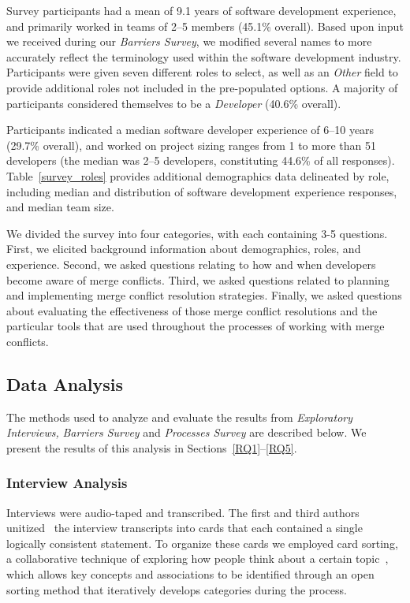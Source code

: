 Survey participants had a mean of 9.1 years of software development experience, and primarily worked in teams of 2--5 members (45.1\% overall).
Based upon input we received during our \textit{Barriers Survey}, we modified several names to more accurately reflect the terminology used within the software development industry.
Participants were given seven different roles to select, as well as an \textit{Other} field to provide additional roles not included in the pre-populated options.
A majority of participants considered themselves to be a \textit{Developer} (40.6\% overall).

Participants indicated a median software developer experience of 6--10 years (29.7\% overall), and worked on project sizing ranges from 1 to more than 51 developers (the median was 2--5 developers, constituting 44.6\% of all responses).
Table~\ref{survey_roles} provides additional demographics data delineated by role, including median and distribution of software development experience responses, and median team size.

We divided the survey into four categories, with each containing 3-5 questions.
First, we elicited background information about demographics, roles, and experience.
Second, we asked questions relating to how and when developers become aware of merge conflicts.
Third, we asked questions related to planning and implementing merge conflict resolution strategies.
Finally, we asked questions about evaluating the effectiveness of those merge conflict resolutions and the particular tools that are used throughout the processes of working with merge conflicts.

\subsection{Data Analysis}\label{analysis}

The methods used to analyze and evaluate the results from \textit{Exploratory Interviews,} \textit{Barriers Survey} and \textit{Processes Survey} are described below.
We present the results of this analysis in Sections~\ref{RQ1}--\ref{RQ5}.

\subsubsection{Interview Analysis}

Interviews were audio-taped and transcribed. 
The first and third authors unitized~\cite{unitization} the interview transcripts into cards that each contained a single logically consistent statement. 
To organize these cards we employed card sorting, a collaborative technique of exploring how people think about a certain topic~\cite{spencer2009card,card_sort}, which allows key concepts and associations to be identified through an open sorting method that iteratively develops categories during the process.

